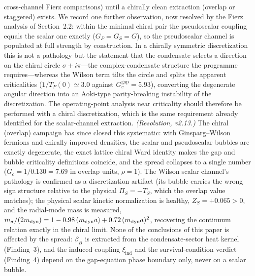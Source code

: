 \documentclass[11pt,a4paper]{article}
\begin{document}
cross-channel Fierz comparisons) until a chirally clean
extraction (overlap or staggered) exists.
We record one further observation, now resolved by the Fierz
analysis of Section~2.2: within the minimal chiral pair the
pseudoscalar coupling equals the scalar one exactly
($G_P = G_S = G$), so the pseudoscalar channel is populated at
full strength by construction.  In a chirally symmetric
discretization this is not a pathology but the statement that the
condensate selects a direction on the chiral circle
$\sigma + i\pi$---the complex-condensate structure the programme
requires---whereas the Wilson term tilts the circle and splits the
apparent criticalities ($1/T_P(0) \simeq 3.0$ against
$G_c^{\mathrm{gap}} = 5.93$), converting the degenerate angular
direction into an Aoki-type parity-breaking instability of the
discretization.  The operating-point analysis near criticality
should therefore be performed with a chiral discretization, which
is the same requirement already identified for the scalar-channel
extraction.
\emph{(Resolution, v2.13.)}  The chiral (overlap) campaign has
since closed this systematic: with Ginsparg--Wilson fermions and
chirally improved densities, the scalar and pseudoscalar bubbles
are exactly degenerate, the exact lattice chiral Ward identity
makes the gap and bubble criticality definitions coincide, and
the spread collapses to a single number
($G_c = 1/0.130 = 7.69$ in overlap units, $\rho = 1$).  The
Wilson scalar channel's pathology is confirmed as a
discretization artifact (its bubble carries the wrong sign
structure relative to the physical $\Pi_S = -T_S$, which the
overlap value matches); the physical scalar kinetic normalization
is healthy, $Z_S = +0.065 > 0$, and the radial-mode mass is
measured, $m_\sigma/(2m_{\rm dyn}) = 1 - 0.98\,(m_{\rm dyn}a)
+ 0.72\,(m_{\rm dyn}a)^2$, recovering the continuum relation
exactly in the chiral limit.
None of the conclusions of this paper is affected by the spread:
$\beta_B$ is extracted from the condensate-sector heat kernel
(Finding~3), and the induced coupling $\xi_{\mathrm{ind}}$ and the
survival-condition verdict (Finding~4) depend on the gap-equation
phase boundary only, never on a scalar bubble.
\end{document}
